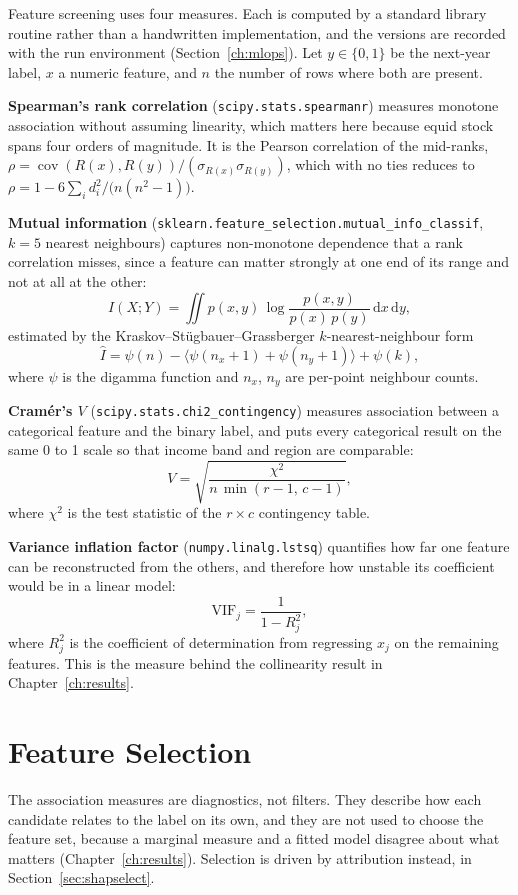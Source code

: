 \documentclass[10pt,openany]{report}
\begin{document}
Feature screening uses four measures. Each is computed by a standard library routine rather than a
handwritten implementation, and the versions are recorded with the run environment
(Section~\ref{ch:mlops}). Let $y \in \{0,1\}$ be the next-year label, $x$ a numeric feature, and $n$
the number of rows where both are present.

\textbf{Spearman's rank correlation} (\texttt{scipy.stats.spearmanr}) measures monotone association
without assuming linearity, which matters here because equid stock spans four orders of magnitude.
It is the Pearson correlation of the mid-ranks, $\rho = \operatorname{cov}(R(x), R(y)) /
(\sigma_{R(x)}\sigma_{R(y)})$, which with no ties reduces to
$\rho = 1 - 6\sum_i d_i^2 / \big(n(n^2-1)\big)$.

\textbf{Mutual information} (\texttt{sklearn.feature\_selection.mutual\_info\_classif}, $k=5$
nearest neighbours) captures non-monotone dependence that a rank correlation misses, since a feature
can matter strongly at one end of its range and not at all at the other:
\[
I(X;Y) = \iint p(x,y)\,\log\frac{p(x,y)}{p(x)\,p(y)}\,\mathrm{d}x\,\mathrm{d}y ,
\]
estimated by the Kraskov--St\"ugbauer--Grassberger $k$-nearest-neighbour form
\[
\hat{I} = \psi(n) - \big\langle \psi(n_x+1) + \psi(n_y+1) \big\rangle + \psi(k),
\]
where $\psi$ is the digamma function and $n_x$, $n_y$ are per-point neighbour counts.

\textbf{Cram\'er's $V$} (\texttt{scipy.stats.chi2\_contingency}) measures association between a
categorical feature and the binary label, and puts every categorical result on the same 0 to 1 scale
so that income band and region are comparable:
\[
V = \sqrt{\frac{\chi^2}{n\,\min(r-1,\,c-1)}} ,
\]
where $\chi^2$ is the test statistic of the $r \times c$ contingency table.

\textbf{Variance inflation factor} (\texttt{numpy.linalg.lstsq}) quantifies how far one feature can
be reconstructed from the others, and therefore how unstable its coefficient would be in a linear
model:
\[
\mathrm{VIF}_j = \frac{1}{1 - R_j^2},
\]
where $R_j^2$ is the coefficient of determination from regressing $x_j$ on the remaining features.
This is the measure behind the collinearity result in Chapter~\ref{ch:results}.

\section{Feature Selection}

The association measures are diagnostics, not filters. They describe how each candidate relates to the
label on its own, and they are not used to choose the feature set, because a marginal measure and a
fitted model disagree about what matters (Chapter~\ref{ch:results}). Selection is driven by
attribution instead, in Section~\ref{sec:shapselect}.
\end{document}
